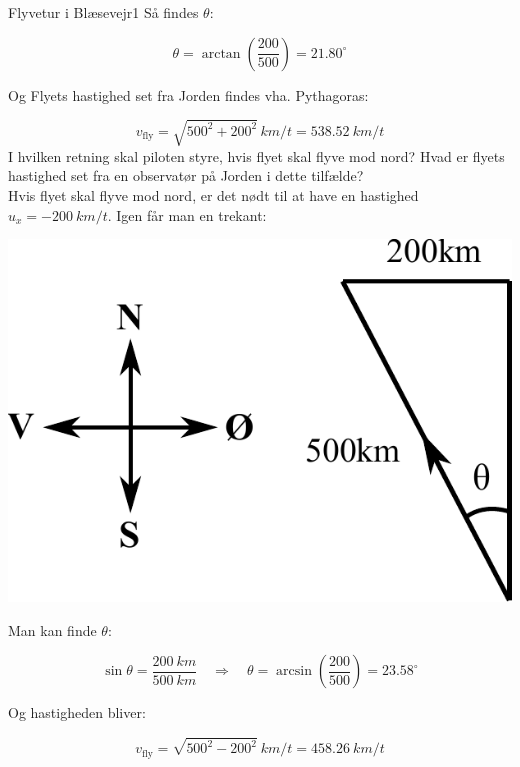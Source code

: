 \documentclass[crop=false, class=memoir]{standalone}
\begin{document}
\begin{opgave}{Flyvetur i Blæsevejr}{1}
	Så findes $\theta$:
	
	$$\theta = \arctan \left( \frac{200}{500} \right) = 21.80^\circ$$
	
	\vspace{2mm}
	
	Og Flyets hastighed set fra Jorden findes vha. Pythagoras:
	
	$$v_{\text{fly}} = \sqrt{500^2 + 200^2} \, \si{km/t} = \SI{538.52}{km/t} $$
	\opg I hvilken retning skal piloten styre, hvis flyet skal flyve mod nord? Hvad er flyets hastighed set fra en observatør på Jorden i dette tilfælde?\\
	
	Hvis flyet skal flyve mod nord, er det nødt til at have en hastighed $u_x = - \SI{200}{km/t}$. Igen får man en trekant:
	
	\begin{center}
		\includegraphics[scale=0.8]{Rel/fly_fig2.pdf}
	\end{center}

	Man kan finde $\theta$:
	
	$$\sin \theta = \frac{\SI{200}{km}}{\SI{500}{km}} \quad \Rightarrow \quad \theta = \arcsin \left( \frac{200}{500} \right) = 23.58^\circ$$
	
	Og hastigheden bliver:
	
	$$v_{\text{fly}} = \sqrt{500^2 - 200^2} \ \si{km/t} = \SI{458.26}{km / t}$$
\end{opgave}
\end{document}
